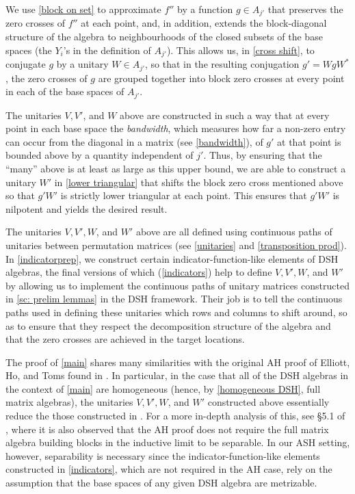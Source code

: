 \documentclass[12pt]{amsart}
\numberwithin{equation}{section}
\theoremstyle{definition}
\theoremstyle{remark}
\begin{document}
We use \autoref{block on set} to approximate $f''$ by a function $g\in A_{j'}$ that preserves the zero crosses of $f''$ at each point, and, in addition, extends the block-diagonal structure of the algebra to neighbourhoods of the closed subsets of the base spaces (the $Y_{i}$'s in the definition of $A_{j'}$). This allows us, in \autoref{cross shift}, to conjugate $g$ by a unitary $W\in A_{j'}$, so that in the resulting conjugation $g'=WgW^{*}$, the zero crosses of $g$ are grouped together into block zero crosses at every point in each of the base spaces of $A_{j'}$.

The unitaries $V,V'$, and $W$ above are constructed in such a way that at every point in each base space the \textit{bandwidth}, which measures how far a non-zero entry can occur from the diagonal in a matrix (see \autoref{bandwidth}), of $g'$ at that point is bounded above by a quantity independent of $j'$. Thus, by ensuring that the ``many'' above is at least as large as this upper bound, we are able to construct a unitary $W'$ in \autoref{lower triangular} that shifts the block zero cross mentioned above so that $g'W'$ is strictly lower triangular at each point. This ensures that $g'W'$ is nilpotent and yields the desired result. 

The unitaries $V,V',W$, and $W'$ above are all defined using continuous paths of unitaries between permutation matrices (see \autoref{unitaries} and \autoref{transposition prod}). In \autoref{indicatorprep}, we construct certain indicator-function-like elements of DSH algebras, the final versions of which (\autoref{indicators}) help to define $V,V',W$, and $W'$ by allowing us to implement the continuous paths of unitary matrices constructed in \cref{sc: prelim lemmas} in the DSH framework. Their job is to tell the continuous paths used in defining these unitaries which rows and columns to shift around, so as to ensure that they respect the decomposition structure of the algebra and that the zero crosses are achieved in the target locations.

The proof of \autoref{main} shares many similarities with the original AH proof of Elliott, Ho, and Toms found in \cite{EHT}. In particular, in the case that all of the DSH algebras in the context of \autoref{main} are homogeneous (hence, by \autoref{homogeneous DSH}, full matrix algebras), the unitaries $V,V',W$, and $W'$ constructed above essentially reduce the those constructed in \cite{EHT}. For a more in-depth analysis of this, see \S 5.1 of \cite{alb}, where it is also observed that the AH proof does not require the full matrix algebra building blocks in the inductive limit to be separable. In our ASH setting, however, separability is necessary since the indicator-function-like elements constructed in \autoref{indicators}, which are not required in the AH case, rely on the assumption that the base spaces of any given DSH algebra are metrizable.
\end{document}
